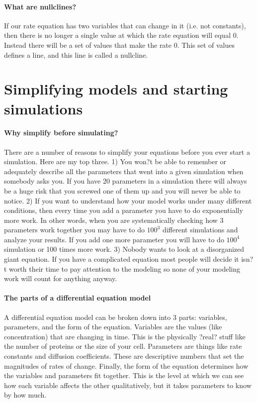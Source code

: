 \paragraph{What are nullclines?} If our rate equation has two variables that can change in it (i.e. not constants), then there is no longer a single value at which the rate equation will equal 0.  Instead there will be a set of values that make the rate 0.  This set of values defines a line, and this line is called a nullcline. 




\section{Simplifying models and starting simulations}
\paragraph{Why simplify before simulating?} There are a number of reasons to simplify your equations before you ever start a simulation.  Here are my top three.  
1) You won?t be able to remember or adequately describe all the parameters that went into a given simulation when somebody asks you.  If you have 20 parameters in a simulation there will always be a huge risk that you screwed one of them up and you will never be able to notice.  
2) If you want to understand how your model works under many different conditions, then every time you add a parameter you have to do exponentially more work.  In other words, when you are systematically checking how 3 parameters work together you may have to do $100^3$ different simulations and analyze your results.  If you add one more parameter you will have to do $100^4$ simulation or 100 times more work.  
3) Nobody wants to look at a disorganized giant equation.  If you have a complicated equation most people will decide it isn?t worth their time to pay attention to the modeling so none of your modeling work will count for anything anyway.

\paragraph{The parts of a differential equation model} A differential equation model can be broken down into 3 parts: variables, parameters, and the form of the equation.  Variables are the values (like concentration) that are changing in time.  This is the physically ?real? stuff like the number of proteins or the size of your cell.  Parameters are things like rate constants and diffusion coefficients.  These are descriptive numbers that set the magnitudes of rates of change.  Finally, the form of the equation determines how the variables and parameters fit together.  This is the level at which we can see how each variable affects the other qualitatively, but it takes parameters to know by how much.

